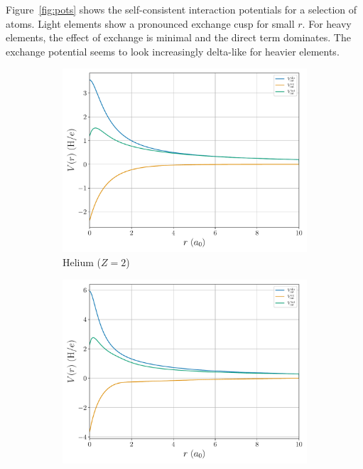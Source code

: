 \documentclass[a4paper,DIV=12,english]{scrartcl}
\begin{document}
Figure~\ref{fig:pots} shows the self-consistent interaction potentials for a selection of atoms. Light elements show a pronounced exchange cusp for small $r$. For heavy elements, the effect of exchange is minimal and the direct term dominates. The exchange potential seems to look increasingly delta-like for heavier elements.

\begin{figure}
    \centering
    \begin{subfigure}{0.49\textwidth}
        \centering
        \includegraphics[width=\textwidth]{../plots/potentials/potential_2.pdf}
        \caption{Helium ($Z=2$)}
        \label{subfig:pot2}
    \end{subfigure}
    \begin{subfigure}{0.49\textwidth}
        \centering
        \includegraphics[width=\textwidth]{../plots/potentials/potential_3.pdf}

\end{subfigure}
\end{figure}
\end{document}
